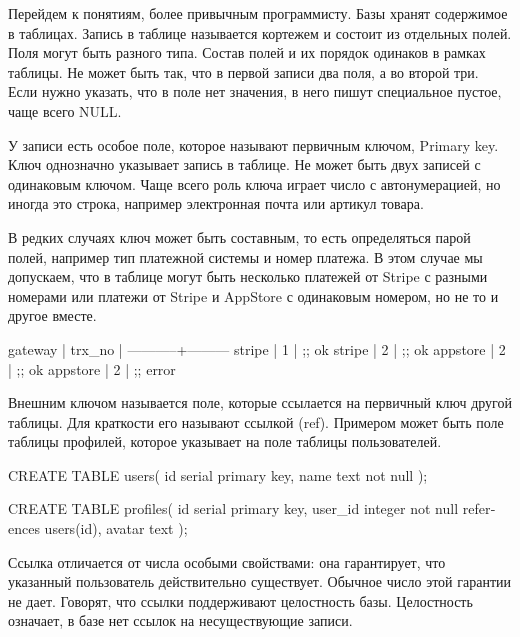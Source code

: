 Перейдем к понятиям, более привычным программисту. Базы хранят содержимое в таблицах. Запись в таблице называется кортежем и состоит из отдельных полей. Поля могут быть разного типа. Состав полей и их порядок одинаков в рамках таблицы. Не может быть так, что в первой записи два поля, а во второй три. Если нужно указать, что в поле нет значения, в него пишут специальное пустое, чаще всего NULL.

У записи есть особое поле, которое называют первичным ключом, Primary key. Ключ однозначно указывает запись в таблице. Не может быть двух записей с одинаковым ключом. Чаще всего роль ключа играет число с автонумерацией, но иногда это строка, например электронная почта или артикул товара.

В редких случаях ключ может быть составным, то есть определяться парой полей, например тип платежной системы и номер платежа. В этом случае мы допускаем, что в таблице могут быть несколько платежей от Stripe с разными номерами или платежи от Stripe и AppStore с одинаковым номером, но не то и другое вместе.

\begin{english}
  \begin{text}
 gateway   | trx_no |
-----------+---------
 stripe    | 1      | ;; ok
 stripe    | 2      | ;; ok
 appstore  | 2      | ;; ok
 appstore  | 2      | ;; error
  \end{text}
\end{english}

Внешним ключом называется поле, которые ссылается на первичный ключ другой таблицы. Для краткости его называют ссылкой (ref). Примером может быть поле  таблицы профилей, которое указывает на поле  таблицы пользователей.

\begin{english}
  \begin{sql}
CREATE TABLE users(
    id   serial primary key,
    name text not null
);

CREATE TABLE profiles(
    id      serial primary key,
    user_id integer not null references users(id),
    avatar  text
);
  \end{sql}
\end{english}

Ссылка отличается от числа особыми свойствами: она гарантирует, что указанный пользователь действительно существует. Обычное число этой гарантии не дает. Говорят, что ссылки поддерживают целостность базы. Целостность означает, в базе нет ссылок на несуществующие записи.

